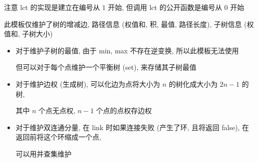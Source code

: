 注意 lct 的实现是建立在编号从 \(1\) 开始, 但调用 lct 的公开函数是编号从 \(0\) 开始

此模板仅维护了树的增减边, 路径信息 (权值和, 积, 最值, 路径长度), 子树信息 (权值和, 子树大小)

\begin{itemize}
    \item 对于维护子树的最值, 由于 min, max 不存在逆变换, 所以此模板无法使用
          
          但可以对于每个点维护一个平衡树 (set), 来存储其子树最值
          
    \item 对于维护边权 (生成树), 可以化边为点将大小为 \(n\) 的树化成大小为 \(2n - 1\) 的树,
          
          其中 \(n\) 个点无点权, \(n-1\) 个点的点权存边权
          
    \item 对于维护双连通分量, 在 link 时如果连接失败 (产生了环, 且将返回 false), 在返回前将这个环缩成一个点,
          
          可以用并查集维护
\end{itemize}
